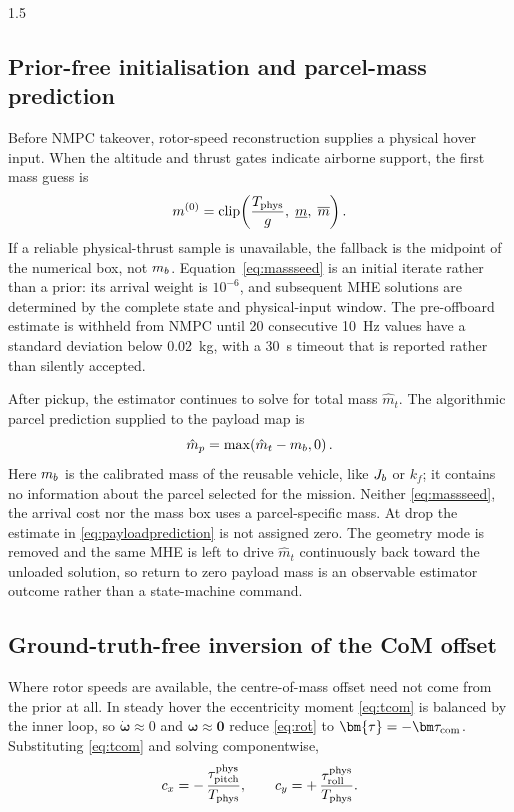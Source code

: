\begin{spacing}{1.5}
\subsection{Prior-free initialisation and parcel-mass prediction}
\label{sec:model:noprior}

Before NMPC takeover, rotor-speed reconstruction supplies a physical
hover input. When the altitude and thrust gates indicate airborne
support, the first mass guess is
\begin{equation}
m^{(0)}=\operatorname{clip}\!\left(
\frac{T_{\mathrm{phys}}}{g},\;\underline m,\;\overline m\right).
\label{eq:massseed}
\end{equation}
If a reliable physical-thrust sample is unavailable, the fallback is the
midpoint of the numerical box, not $m_b$. Equation~\eqref{eq:massseed}
is an initial iterate rather than a prior: its arrival weight is
$10^{-6}$, and subsequent MHE solutions are determined by the complete
state and physical-input window. The pre-offboard estimate is withheld
from NMPC until 20 consecutive \SI{10}{Hz} values have a standard
deviation below \SI{0.02}{\kg}, with a \SI{30}{s} timeout that is
reported rather than silently accepted.

After pickup, the estimator continues to solve for total mass $\hat m_t$.
The algorithmic parcel prediction supplied to the payload map is
\begin{equation}
\hat m_p=\max\!\left(\hat m_t-m_b,0\right).
\label{eq:payloadprediction}
\end{equation}
Here $m_b$ is the calibrated mass of the reusable vehicle, like $J_b$
or $k_f$; it contains no information about the parcel selected for the
mission. Neither \eqref{eq:massseed}, the arrival cost nor the mass box
uses a parcel-specific mass. At drop the estimate in
\eqref{eq:payloadprediction} is not assigned zero. The geometry mode is
removed and the same MHE is left to drive $\hat m_t$ continuously back
toward the unloaded solution, so return to zero payload mass is an
observable estimator outcome rather than a state-machine command.

\subsection{Ground-truth-free inversion of the CoM offset}\label{sec:model:conline}

Where rotor speeds are available, the centre-of-mass offset need not come
from the prior at all. In steady hover the eccentricity moment
\eqref{eq:tcom} is balanced by the inner loop, so
$\dot{\bm{\omega}} \approx 0$ and $\bm{\omega} \approx \bm{0}$ reduce
\eqref{eq:rot} to $\bm{\tau} = -\tcom$. Substituting \eqref{eq:tcom} and
solving componentwise,
\begin{equation}
c_x = -\,\frac{\tau_{\mathrm{pitch}}^{\mathrm{phys}}}{T_{\mathrm{phys}}},
\qquad
c_y = +\,\frac{\tau_{\mathrm{roll}}^{\mathrm{phys}}}{T_{\mathrm{phys}}}.
\label{eq:conline}
\end{equation}


\end{spacing}
